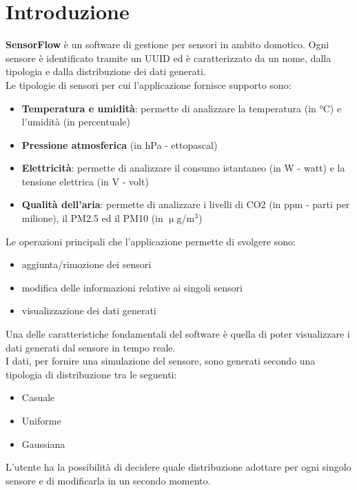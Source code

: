 \documentclass[a4paper, 12pt]{article}
\begin{document}
    \section{Introduzione}
    \textbf{SensorFlow} è un software di gestione per sensori in ambito domotico. Ogni sensore è identificato tramite un UUID ed è caratterizzato da un nome, dalla tipologia e dalla distribuzione dei dati generati.\\
    Le tipologie di sensori per cui l'applicazione fornisce supporto sono:
    \begin{itemize}
        \item \textbf{Temperatura e umidità}: permette di analizzare la temperatura (in °C) e l'umidità (in percentuale)
        \item \textbf{Pressione atmosferica} (in hPa - ettopascal) 
        \item \textbf{Elettricità}: permette di analizzare il consumo istantaneo (in W - watt) e la tensione elettrica (in V - volt)
        \item \textbf{Qualità dell'aria}: permette di analizzare i livelli di CO2 (in ppm - parti per milione), il PM2.5 ed il PM10 (in $\upmu$g/m$^3$)
    \end{itemize}
    Le operazioni principali che l'applicazione permette di svolgere sono:
    \begin{itemize}
        \item aggiunta/rimozione dei sensori
        \item modifica delle informazioni relative ai singoli sensori
        \item visualizzazione dei dati generati
    \end{itemize}
    Una delle caratteristiche fondamentali del software è quella di poter visualizzare i dati generati dal sensore in tempo reale.\\
    I dati, per fornire una simulazione del sensore, sono generati secondo una tipologia di distribuzione tra le seguenti:
    \begin{itemize}
        \item Casuale
        \item Uniforme
        \item Gaussiana
    \end{itemize}
    L'utente ha la possibilità di decidere quale distribuzione adottare per ogni singolo sensore e di modificarla in un secondo momento.
\end{document}
